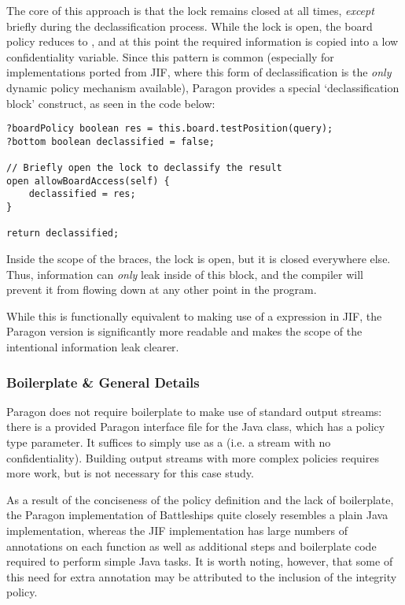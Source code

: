 The core of this approach is that the lock remains closed at all times, \textit{except} briefly during the declassification process. While the lock is open, the board policy reduces to , and at this point the required information is copied into a low confidentiality variable. Since this pattern is common (especially for implementations ported from JIF, where this form of declassification is the \textit{only} dynamic policy mechanism available), Paragon provides a special `declassification block' construct, as seen in the code below:

\begin{verbatim}
?boardPolicy boolean res = this.board.testPosition(query);
?bottom boolean declassified = false;

// Briefly open the lock to declassify the result
open allowBoardAccess(self) {
	declassified = res;
}

return declassified;
\end{verbatim}

Inside the scope of the braces, the lock is open, but it is closed everywhere else. Thus, information can \textit{only} leak inside of this block, and the compiler will prevent it from flowing down at any other point in the program.

While this is functionally equivalent to making use of a  expression in JIF, the Paragon version is significantly more readable and makes the scope of the intentional information leak clearer.

\subsubsection{Boilerplate \& General Details}

Paragon does not require boilerplate to make use of standard output streams: there is a provided Paragon interface file for the Java  class, which has a policy type parameter. It suffices to simply use  as a  (i.e. a stream with no confidentiality). Building output streams with more complex policies requires more work, but is not necessary for this case study.

As a result of the conciseness of the policy definition and the lack of boilerplate, the Paragon implementation of Battleships quite closely resembles a plain Java implementation, whereas the JIF implementation has large numbers of annotations on each function as well as additional steps and boilerplate code required to perform simple Java tasks. It is worth noting, however, that some of this need for extra annotation may be attributed to the inclusion of the integrity policy.

